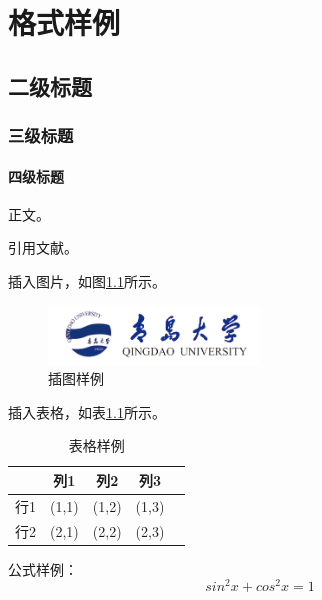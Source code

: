 \chapter{格式样例}
\section{二级标题}
\subsection{三级标题}
\subsubsection{四级标题}
正文。

引用文献\cite{刘海洋2013LATEX}。

插入图片，如图\ref{fig:sample_figure}所示。
\begin{figure}[htb]
\centering
\includegraphics[width=0.5\textwidth]{figures/logo.png}
\caption{插图样例}
\label{fig:sample_figure}
\end{figure}

插入表格，如表\ref{tab:sample_table}所示。
\begin{table}[htb]
\centering
\caption{表格样例}
\label{tab:sample_table}
\begin{tabular}{lcccc}
\hline
~~&列1&列2&列3\\
\hline
行1 & (1,1) & (1,2) & (1,3)\\
行2 & (2,1) & (2,2) & (2,3)\\
\hline
\end{tabular}
\end{table}

公式样例：
\begin{equation}
sin^2x+cos^2x=1
\end{equation}